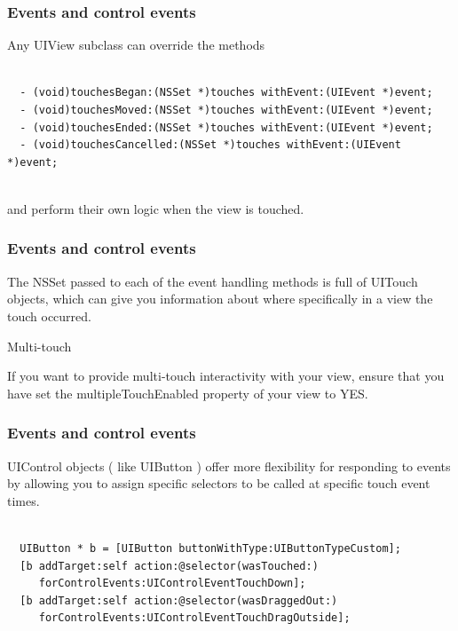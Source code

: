 \documentclass[10pt]{beamer}
\begin{document}
    
\begin{frame}[fragile]
  \frametitle{Events and control events}
  Any UIView subclass can override the methods
\begin{listing}[H]
    \begin{verbatim}
  
  - (void)touchesBegan:(NSSet *)touches withEvent:(UIEvent *)event;
  - (void)touchesMoved:(NSSet *)touches withEvent:(UIEvent *)event;
  - (void)touchesEnded:(NSSet *)touches withEvent:(UIEvent *)event;
  - (void)touchesCancelled:(NSSet *)touches withEvent:(UIEvent *)event;
              
  \end{verbatim}
    \caption{Touch events}
    \label{listing:29}
  \end{listing}

and perform their own logic when the view is touched.

\end{frame}

\begin{frame}[fragile]
  \frametitle{Events and control events}
  The NSSet passed to each of the event handling methods is full of UITouch objects, which can give you information about where specifically in a view the touch occurred.
\begin{alertblock}{Multi-touch}
  
  If you want to provide multi-touch interactivity with your view,
  ensure that you have set the multipleTouchEnabled property of your
  view to YES.
              
  \end{alertblock}

\end{frame}

\begin{frame}[fragile]
  \frametitle{Events and control events}
  UIControl objects ( like UIButton ) offer more flexibility for responding to events by allowing you to assign specific selectors to be called at specific touch event times.
\begin{listing}[H]
    \begin{verbatim}
  
  UIButton * b = [UIButton buttonWithType:UIButtonTypeCustom];
  [b addTarget:self action:@selector(wasTouched:)
     forControlEvents:UIControlEventTouchDown];
  [b addTarget:self action:@selector(wasDraggedOut:)
     forControlEvents:UIControlEventTouchDragOutside];
              
  \end{verbatim}
    \caption{Handling UIButton events}
    \label{listing:30}
  \end{listing}

\end{frame}
\end{document}
